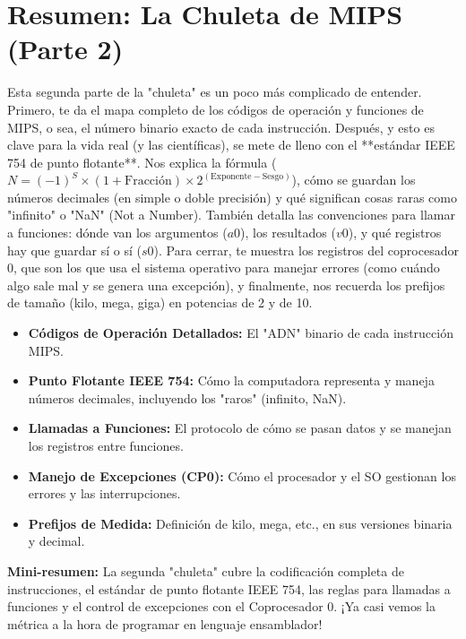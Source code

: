 \documentclass{article}
\begin{document}
\section*{Resumen: La Chuleta de MIPS (Parte 2)}
Esta segunda parte de la "chuleta" es un poco más complicado de entender. Primero, te da el mapa completo de los códigos de operación y funciones de MIPS, o sea, el número binario exacto de cada instrucción. Después, y esto es clave para la vida real (y las científicas), se mete de lleno con el **estándar IEEE 754 de punto flotante**. Nos explica la fórmula ($N = (-1)^S \times (1 + \text{Fracción}) \times 2^{(\text{Exponente} - \text{Sesgo})}$), cómo se guardan los números decimales (en simple o doble precisión) y qué significan cosas raras como "infinito" o "NaN" (Not a Number). También detalla las convenciones para llamar a funciones: dónde van los argumentos ($a0$), los resultados ($v0$), y qué registros hay que guardar sí o sí ($s0$). Para cerrar, te muestra los registros del coprocesador 0, que son los que usa el sistema operativo para manejar errores (como cuándo algo sale mal y se genera una excepción), y finalmente, nos recuerda los prefijos de tamaño (kilo, mega, giga) en potencias de 2 y de 10.

\begin{itemize}
    \item \textbf{Códigos de Operación Detallados:} El "ADN" binario de cada instrucción MIPS.
    \item \textbf{Punto Flotante IEEE 754:} Cómo la computadora representa y maneja números decimales, incluyendo los "raros" (infinito, NaN).
    \item \textbf{Llamadas a Funciones:} El protocolo de cómo se pasan datos y se manejan los registros entre funciones.
    \item \textbf{Manejo de Excepciones (CP0):} Cómo el procesador y el SO gestionan los errores y las interrupciones.
    \item \textbf{Prefijos de Medida:} Definición de kilo, mega, etc., en sus versiones binaria y decimal.
\end{itemize}
\textbf{Mini-resumen:} La segunda "chuleta" cubre la codificación completa de instrucciones, el estándar de punto flotante IEEE 754, las reglas para llamadas a funciones y el control de excepciones con el Coprocesador 0. ¡Ya casi vemos la métrica a la hora de programar en lenguaje ensamblador!
\end{document}
